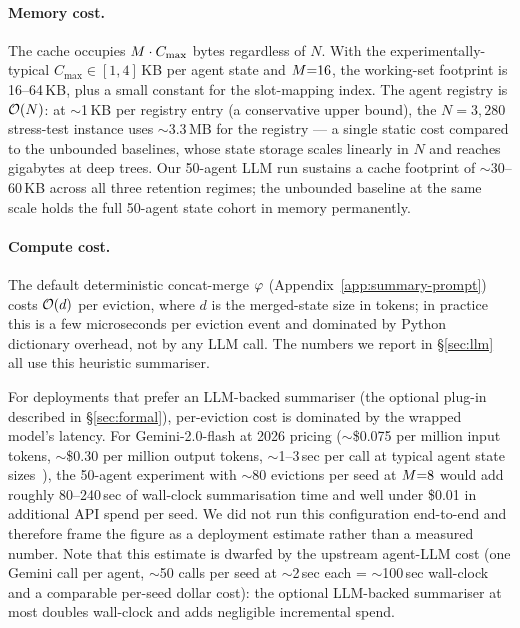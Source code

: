 \paragraph{Memory cost.}
The cache occupies $M \cdot C_{\max}$ bytes regardless of $N$.
With the experimentally-typical $C_{\max} \in [1, 4]$\,KB per agent
state and $M{=}16$, the working-set footprint is 16--64\,KB, plus
a small constant for the slot-mapping index.  The agent registry is
$\mathcal{O}(N)$: at $\sim$1\,KB per registry entry (a conservative upper
bound), the $N{=}3{,}280$ stress-test instance uses $\sim$3.3\,MB
for the registry --- a single static cost compared to the unbounded
baselines, whose state storage scales linearly in $N$ and reaches
gigabytes at deep trees.  Our 50-agent LLM run sustains a cache
footprint of $\sim$30--60\,KB across all three retention regimes;
the unbounded baseline at the same scale holds the full 50-agent
state cohort in memory permanently.

\paragraph{Compute cost.}
The default deterministic concat-merge $\varphi$
(Appendix~\ref{app:summary-prompt}) costs $\mathcal{O}(d)$ per eviction, where
$d$ is the merged-state size in tokens; in practice this is a few
microseconds per eviction event and dominated by Python dictionary
overhead, not by any LLM call.  The numbers we report in
\S\ref{sec:llm} all use this heuristic summariser.

For deployments that prefer an LLM-backed summariser (the optional
plug-in described in \S\ref{sec:formal}), per-eviction cost is
dominated by the wrapped model's latency.  For Gemini-2.0-flash at
2026 pricing ($\sim$\$0.075 per million input tokens, $\sim$\$0.30
per million output tokens, $\sim$1--3\,sec per call at typical agent
state sizes~\citep{gemini2024pricing}), the 50-agent experiment with
$\sim$80 evictions per seed at $M{=}8$ would add roughly
80--240\,sec of wall-clock summarisation time and well under \$0.01
in additional API spend per seed.  We did not run this configuration
end-to-end and therefore frame the figure as a deployment estimate
rather than a measured number.  Note that this estimate is dwarfed
by the upstream agent-LLM cost (one Gemini call per agent, $\sim$50
calls per seed at $\sim$2\,sec each = $\sim$100\,sec wall-clock and
a comparable per-seed dollar cost): the optional LLM-backed
summariser at most doubles wall-clock and adds negligible incremental
spend.

